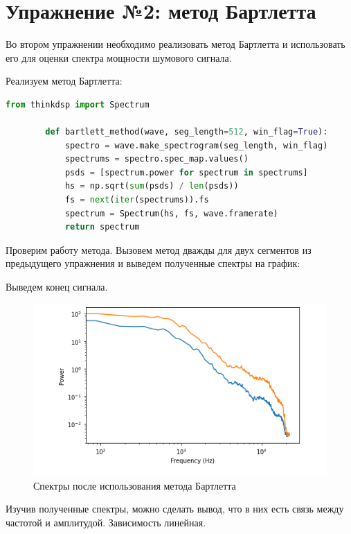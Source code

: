 \documentclass[a4paper, 14pt]{extarticle}
\begin{document}
    \newpage


    \section{Упражнение №2: метод Бартлетта}
    \label{sec:2}

    Во втором упражнении необходимо реализовать метод Бартлетта и использовать его для оценки спектра мощности шумового сигнала.

    Реализуем метод Бартлетта:

    \begin{lstlisting}[language=Python, caption= Метод Бартлетта, label={lst:method_bartlett}]
        from thinkdsp import Spectrum

        def bartlett_method(wave, seg_length=512, win_flag=True):
            spectro = wave.make_spectrogram(seg_length, win_flag)
            spectrums = spectro.spec_map.values()
            psds = [spectrum.power for spectrum in spectrums]
            hs = np.sqrt(sum(psds) / len(psds))
            fs = next(iter(spectrums)).fs
            spectrum = Spectrum(hs, fs, wave.framerate)
            return spectrum
    \end{lstlisting}

    Проверим работу метода.
    Вызовем метод дважды для двух сегментов из предыдущего упражнения и выведем полученные спектры на график:

    Выведем конец сигнала.

    \begin{figure}[H]
        \centering
        \includegraphics[width=0.8\linewidth]{sea_segment_1_and_2_Bartlett}
        \caption{Спектры после использования метода Бартлетта}
        \label{fig:sea_segment_1_and_2_Bartlett}
    \end{figure}

    Изучив полученные спектры, можно сделать вывод, что в них есть связь между частотой и амплитудой.
    Зависимость линейная.
\end{document}
